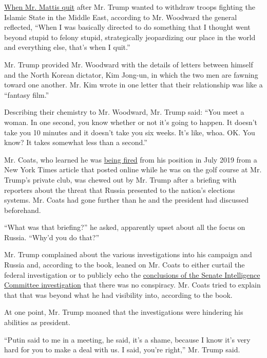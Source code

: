 \href{https://www.nytimes3xbfgragh.onion/2018/12/20/us/politics/jim-mattis-defense-secretary-trump.html}{When
Mr. Mattis quit} after Mr. Trump wanted to withdraw troops fighting the
Islamic State in the Middle East, according to Mr. Woodward the general
reflected, ``When I was basically directed to do something that I
thought went beyond stupid to felony stupid, strategically jeopardizing
our place in the world and everything else, that's when I quit.''

Mr. Trump provided Mr. Woodward with the details of letters between
himself and the North Korean dictator, Kim Jong-un, in which the two men
are fawning toward one another. Mr. Kim wrote in one letter that their
relationship was like a ``fantasy film.''

Describing their chemistry to Mr. Woodward, Mr. Trump said: ``You meet a
woman. In one second, you know whether or not it's going to happen. It
doesn't take you 10 minutes and it doesn't take you six weeks. It's
like, whoa. OK. You know? It takes somewhat less than a second.''

Mr. Coats, who learned he was
\href{https://www.nytimes3xbfgragh.onion/2019/07/28/us/politics/dan-coats-intelligence-chief-out.html}{being
fired} from his position in July 2019 from a New York Times article that
posted online while he was on the golf course at Mr. Trump's private
club, was chewed out by Mr. Trump after a briefing with reporters about
the threat that Russia presented to the nation's elections systems. Mr.
Coats had gone further than he and the president had discussed
beforehand.

``What was that briefing?'' he asked, apparently upset about all the
focus on Russia. ``Why'd you do that?''

Mr. Trump complained about the various investigations into his campaign
and Russia and, according to the book, leaned on Mr. Coats to either
curtail the federal investigation or to publicly echo the
\href{https://www.nytimes3xbfgragh.onion/2020/08/18/us/politics/senate-intelligence-russian-interference-report.html}{conclusions
of the Senate Intelligence Committee investigation} that there was no
conspiracy. Mr. Coats tried to explain that that was beyond what he had
visibility into, according to the book.

At one point, Mr. Trump moaned that the investigations were hindering
his abilities as president.

``Putin said to me in a meeting, he said, it's a shame, because I know
it's very hard for you to make a deal with us. I said, you're right,''
Mr. Trump said.

